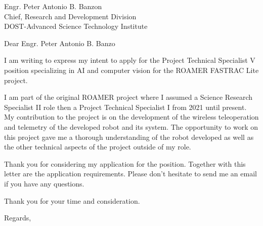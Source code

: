 \documentclass{letter}
\begin{document}
\begin{letter}{Engr. Peter Antonio B. Banzon \\ Chief, Research and Development Division \\ DOST-Advanced Science Technology Institute}
\opening{Dear Engr. Peter Antonio B. Banzo}

I am writing to express my intent to apply for the Project Technical Specialist V position specializing in AI and computer vision for the ROAMER FASTRAC Lite project.  

I am part of the original ROAMER project where I assumed a Science Research Specialist
II role then a Project Technical Specialist I from 2021 until present. My contribution to the
project is on the development of the wireless teleoperation and telemetry of the developed robot and its system. The opportunity to work on this project gave me a thorough understanding of the robot developed as well as the other technical aspects of the project outside of my role. 

Thank you for considering my application for the position.
Together with this letter are the application requirements. Please don’t hesitate to send me an
email if you have any questions.

Thank you for your time and consideration.
\\
\closing{Regards,}





\end{letter}
\end{document}
